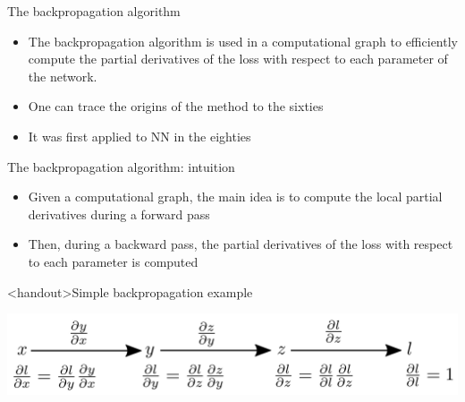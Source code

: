 \documentclass[xcolor=pdftex,dvipsnames,table,mathserif]{beamer}
\begin{document}
\begin{frame}{The backpropagation algorithm}

  \begin{itemize}
  \item The backpropagation algorithm is used in a computational graph to efficiently compute the partial derivatives of the loss with respect to each parameter of the network.
  \item One can trace the origins of the method to the sixties
  \item It was first applied to NN in the eighties \cite{werbos_applications_1982, lecun_procedure_1985}
  \end{itemize}


\end{frame}


\begin{frame}{The backpropagation algorithm: intuition}

  \begin{itemize}
  \item Given a computational graph, the main idea is to compute the local partial derivatives during a forward pass
    \item Then, during a backward pass, the partial derivatives of the loss with respect to each parameter is computed
  \end{itemize}


\end{frame}





\begin{frame}<handout>{Simple backpropagation example}

\includegraphics[width=\textwidth]{bp_simple.png}

\end{frame}
\end{document}
